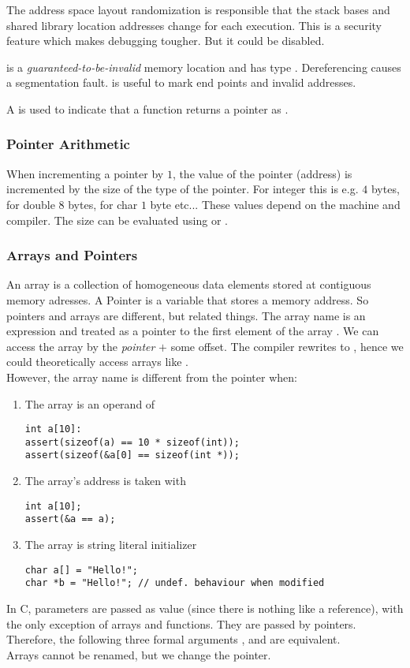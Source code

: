 The address space layout randomization is responsible that the stack bases and shared library location addresses change for each execution. This is a security feature which makes debugging tougher. But it could be disabled.

 is a \textit{guaranteed-to-be-invalid} memory location and has type . Dereferencing  causes a segmentation fault.  is useful to mark end points and invalid addresses.

A \code{*} is used to indicate that a function returns a pointer as .

\subsubsection{Pointer Arithmetic}
When incrementing a pointer by $1$, the value of the pointer (address) is incremented by the size of the type of the pointer. For integer this is e.g. $4$ bytes, for double $8$ bytes, for char $1$ byte etc... These values depend on the machine and compiler. The size can be evaluated using  or .

\subsubsection{Arrays and Pointers}
An array is a collection of homogeneous data elements stored at contiguous memory adresses. A Pointer is a variable that stores a memory address. So pointers and arrays are different, but related things. The array name is an expression and treated as a pointer to the first element of the array . We can access the array by the \textit{pointer} $+$ some offset. The compiler rewrites  to , hence we could theoretically access arrays like .\\
However, the array name is different from the pointer when:
\begin{enumerate}
    \item The array is an operand of 
\begin{lstlisting}
int a[10]:
assert(sizeof(a) == 10 * sizeof(int));
assert(sizeof(&a[0] == sizeof(int *));
\end{lstlisting}
    \item The array's address is taken with \code{\&}
\begin{lstlisting}
int a[10];
assert(&a == a);
\end{lstlisting}
    \item The array is string literal initializer
\begin{lstlisting}
char a[] = "Hello!";
char *b = "Hello!"; // undef. behaviour when modified
\end{lstlisting}
\end{enumerate}
In C, parameters are passed as value (since there is nothing like a reference), with the only exception of arrays and functions. They are passed by pointers. Therefore, the following three formal arguments ,  and  are equivalent.\\ 
Arrays cannot be renamed, but we change the pointer.


